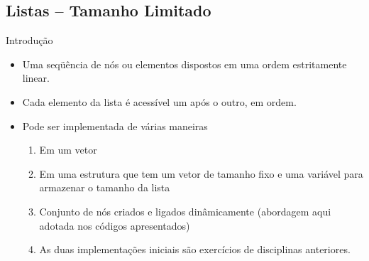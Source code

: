 


\subsection{Listas -- Tamanho Limitado}
  \begin{frame}{Introdução}    
		\begin{itemize}
			\item Uma seqüência de nós ou elementos dispostos em uma ordem estritamente linear.
			\item Cada elemento da lista é acessível um após o outro, em ordem.
			\item Pode ser implementada de várias maneiras			
				\begin{enumerate}
					\item Em um vetor
					\item Em uma estrutura que tem um vetor de tamanho fixo e uma 
					variável para armazenar o tamanho da lista
					\item Conjunto de nós criados e ligados dinâmicamente (abordagem aqui adotada nos códigos apresentados)
					\pause
					\item As duas implementações iniciais são exercícios de disciplinas anteriores.
				\end{enumerate}
		\end{itemize}
  \end{frame}

